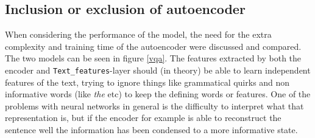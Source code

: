 \documentclass[10pt,a4paper]{report}
\begin{document}
	\subsection*{Inclusion or exclusion of autoencoder}
	When considering the performance of the model, the need for the extra complexity and training time of the autoencoder were discussed and compared. The two models can be seen in figure \ref{vqa}. The features extracted by both the encoder and \texttt{Text\_features}-layer should (in theory) be able to learn independent features of the text, trying to ignore things like grammatical quirks and non informative words (like \textit{the} etc) to keep the defining words or features. One of the problems with neural networks in general is the difficulty to interpret what that representation is, but if the encoder for example is able to reconstruct the sentence well the information has been condensed to a more informative state.
\end{document}
